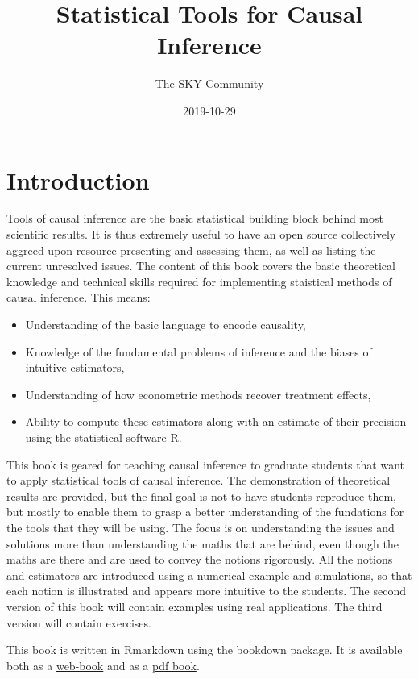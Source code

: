 \documentclass[]{book}
\title{Statistical Tools for Causal Inference}
\author{The SKY Community}
\date{2019-10-29}
\providecommand{\tightlist}{%
  \setlength{\itemsep}{0pt}\setlength{\parskip}{0pt}}
\theoremstyle{definition}
\theoremstyle{definition}
\theoremstyle{definition}
\theoremstyle{remark}
\begin{document}
\maketitle

{
\setcounter{tocdepth}{0}
\tableofcontents
}
\chapter*{Introduction}\label{introduction}

Tools of causal inference are the basic statistical building block
behind most scientific results. It is thus extremely useful to have an
open source collectively aggreed upon resource presenting and assessing
them, as well as listing the current unresolved issues. The content of
this book covers the basic theoretical knowledge and technical skills
required for implementing staistical methods of causal inference. This
means:

\begin{itemize}
\tightlist
\item
  Understanding of the basic language to encode causality,
\item
  Knowledge of the fundamental problems of inference and the biases of
  intuitive estimators,
\item
  Understanding of how econometric methods recover treatment effects,
\item
  Ability to compute these estimators along with an estimate of their
  precision using the statistical software R.
\end{itemize}

This book is geared for teaching causal inference to graduate students
that want to apply statistical tools of causal inference. The
demonstration of theoretical results are provided, but the final goal is
not to have students reproduce them, but mostly to enable them to grasp
a better understanding of the fundations for the tools that they will be
using. The focus is on understanding the issues and solutions more than
understanding the maths that are behind, even though the maths are there
and are used to convey the notions rigorously. All the notions and
estimators are introduced using a numerical example and simulations, so
that each notion is illustrated and appears more intuitive to the
students. The second version of this book will contain examples using
real applications. The third version will contain exercises.

This book is written in Rmarkdown using the bookdown package. It is
available both as a \href{https://chabefer.github.io/STCI/}{web-book}
and as a \href{https://chabefer.github.io/STCI/STCI.pdf}{pdf book}.
\end{document}
